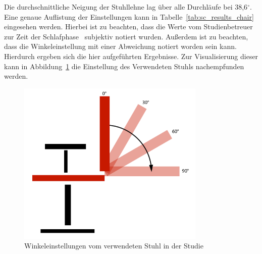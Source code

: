Die durchschnittliche Neigung der Stuhllehne lag über alle Durchläufe bei 38,6$^\circ$. Eine genaue Auflistung der Einstellungen kann in Tabelle~\ref{tab:sc_results_chair} eingesehen werden. Hierbei ist zu beachten, dass die Werte vom Studienbetreuer zur Zeit der Schlafphase~ subjektiv notiert wurden. Außerdem ist zu beachten, dass die Winkeleinstellung mit einer Abweichung notiert worden sein kann. Hierdurch ergeben sich die hier aufgeführten Ergebnisse. Zur Visualisierung dieser kann in Abbildung~\ref{fig:chair_backrest} die Einstellung des Verwendeten Stuhls nachempfunden~ werden.

\begin{figure}
	\includegraphics[width=0.8\textwidth]{./images/chair}
	\caption{Winkeleinstellungen vom verwendeten Stuhl in der Studie}
	\label{fig:chair_backrest}
\end{figure}



